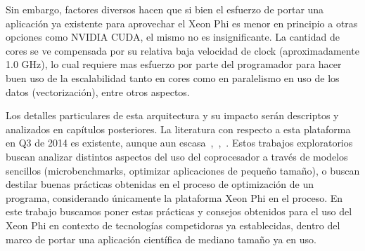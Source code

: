 Sin embargo, factores diversos hacen que si bien el esfuerzo de portar una aplicación ya existente para aprovechar el Xeon Phi es menor en principio
a otras opciones como NVIDIA CUDA, el mismo no es insignificante. La cantidad de cores se ve compensada por su relativa baja velocidad de clock
(aproximadamente 1.0 GHz), lo cual requiere mas esfuerzo por parte del programador para hacer buen uso de la escalabilidad tanto en cores como en
paralelismo en uso de los datos (vectorización), entre otros aspectos.~\cite{IntelXeonPhiWhitePaper}

Los detalles particulares de esta arquitectura y su impacto serán descriptos y analizados en capítulos posteriores.
La literatura con respecto a esta plataforma en Q3 de 2014 es existente, aunque aun escasa~\cite{Fang},~\cite{Pennycook},~\cite{Mielikainen}. Estos trabajos
exploratorios buscan analizar distintos aspectos del uso del coprocesador a trav\'es de  modelos sencillos (microbenchmarks, optimizar aplicaciones de peque\~no tama\~no), o buscan destilar buenas prácticas obtenidas en el proceso de optimización de un programa, considerando \'unicamente la plataforma Xeon Phi en el proceso. En este trabajo buscamos poner estas prácticas y consejos obtenidos para el uso del Xeon Phi en contexto de tecnolog\'ias competidoras ya establecidas, dentro del marco de portar una aplicaci\'on cient\'ifica de mediano tama\~no ya en uso.
